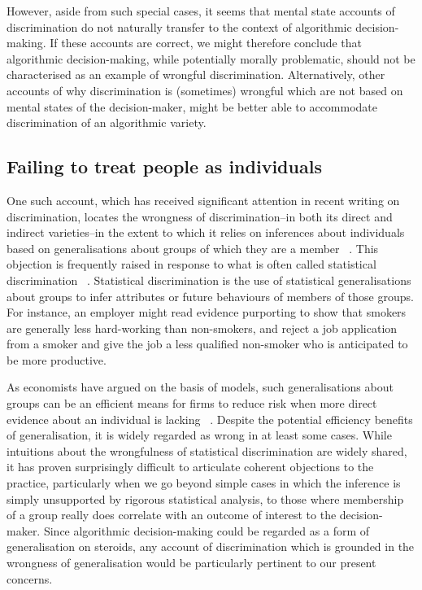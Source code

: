 \documentclass[pmlr,twocolumn,10pt]{jmlr}%
\begin{document}
However, aside from such special cases, it seems that mental state accounts of discrimination do not naturally transfer to the context of algorithmic decision-making. If these accounts are correct, we might therefore conclude that algorithmic decision-making, while potentially morally problematic, should not be characterised as an example of wrongful discrimination. Alternatively, other accounts of why discrimination is (sometimes) wrongful which are not based on mental states of the decision-maker, might be better able to accommodate discrimination of an algorithmic variety.

\subsection{Failing to treat people as individuals}

One such account, which has received significant attention in recent writing on discrimination, locates the wrongness of discrimination--in both its direct and indirect varieties--in the extent to which it relies on inferences about individuals based on generalisations about groups of which they are a member ~\cite{lippert2014born}. This objection is frequently raised in response to what is often called statistical discrimination ~\cite{phelps1972statistical}. Statistical discrimination is the use of statistical generalisations about groups to infer attributes or future behaviours of members of those groups. For instance, an employer might read evidence purporting to show that smokers are generally less hard-working than non-smokers, and reject a job application from a smoker and give the job a less qualified non-smoker who is anticipated to be more productive.

As economists have argued on the basis of models, such generalisations about groups can be an efficient means for firms to reduce risk when more direct evidence about an individual is lacking ~\cite{phelps1972statistical}. Despite the potential efficiency benefits of generalisation, it is widely regarded as wrong in at least some cases. While intuitions about the wrongfulness of statistical discrimination are widely shared, it has proven surprisingly difficult to articulate coherent objections to the practice, particularly when we go beyond simple cases in which the inference is simply unsupported by rigorous statistical analysis, to those where membership of a group really does correlate with an outcome of interest to the decision-maker. Since algorithmic decision-making could be regarded as a form of generalisation on steroids, any account of discrimination which is grounded in the wrongness of generalisation would be particularly pertinent to our present concerns.
\end{document}

